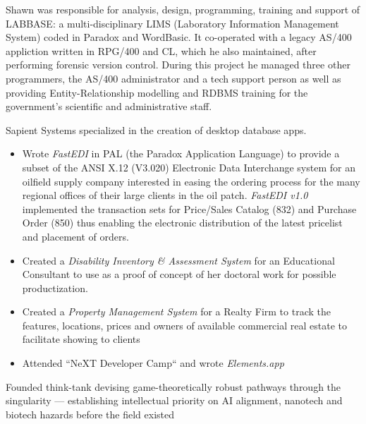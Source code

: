 \documentclass[line,margin,hidelinks]{res}
\begin{document}
\begin{resume}
\begin{position}
\begin{itemize}
\end{itemize}

\end{position}


\begin{position}
  Shawn was responsible for analysis, design, programming,
  training and support of LABBASE: a multi-disciplinary LIMS
  (Laboratory Information Management System) coded in Paradox and
  WordBasic.  It co-operated with a legacy AS/400 appliction written
  in RPG/400 and CL, which he also maintained, after performing
  forensic version control.  During this project he
  managed three other programmers, the AS/400 administrator and a tech
  support person as well as providing Entity-Relationship modelling and
  RDBMS training for the government's scientific and administrative
  staff.
\end{position}


\begin{position}
Sapient Systems specialized in the creation of desktop database apps.
\begin{itemize}
\item Wrote {\it FastEDI} in PAL (the Paradox Application Language)  to
	provide a subset of the
	ANSI X.12 (V3.020) Electronic Data Interchange system for an
	oilfield supply company interested in easing the ordering process for
	the many regional offices of their large clients in the oil patch.
	{\it FastEDI v1.0} implemented
	the transaction sets for Price/Sales Catalog (832) and
	Purchase Order (850) thus enabling the electronic distribution
	of the latest pricelist and placement of orders.
\item Created a {\it Disability Inventory \& Assessment System }
	for an Educational Consultant to use as a proof of concept of
	her doctoral work for possible productization.
\item Created a {\it Property Management System} for a Realty Firm to
	track the features, locations, prices and owners of
	available commercial real estate to facilitate showing to clients
\item Attended ``NeXT Developer Camp`` and wrote \emph{Elements.app}
\end{itemize}
\end{position}


\begin{position}
  Founded think-tank devising game-theoretically robust pathways
  through the singularity --- establishing intellectual priority on
  AI alignment, nanotech and biotech hazards before the field existed
\end{position}


\end{resume}
\end{document}
